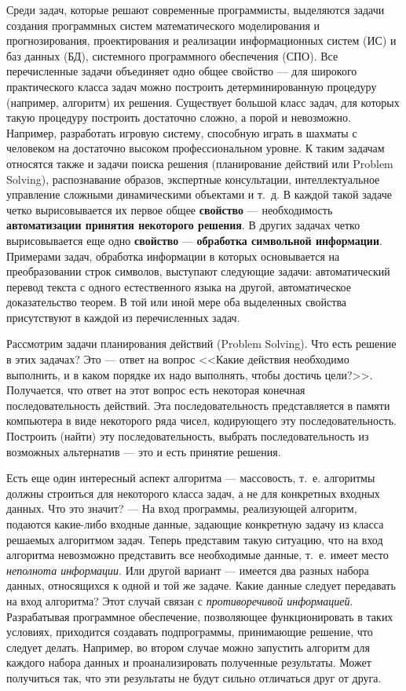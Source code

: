 \documentclass[12pt, openany, twoside]{book} %
\begin{document}
Среди задач, которые решают современные программисты, выделяются задачи создания программных систем математического моделирования и прогнозирования, проектирования и реализации информационных систем (ИС) и баз данных (БД), системного программного обеспечения (СПО). Все перечисленные задачи объединяет одно общее свойство --- для широкого практического класса задач можно построить детерминированную процедуру (например, алгоритм) их решения. Существует большой класс задач, для которых такую процедуру построить достаточно сложно, а порой и невозможно. Например, разработать игровую систему, способную играть в шахматы с человеком на достаточно высоком профессиональном уровне. К таким задачам относятся также и задачи поиска решения (планирование действий или Problem Sol\-ving), распознавание образов, экспертные консультации, интеллектуальное управление сложными динамическими объектами и т.~д. В каждой такой задаче четко вырисовывается их первое общее {\bf свойство} --- необходимость {\bf автоматизации принятия некоторого решения}. В других задачах четко вырисовывается еще одно {\bf свойство} --- {\bf обработка символьной информации}. Примерами задач, обработка информации в которых основывается на преобразовании строк символов, выступают следующие задачи: автоматический перевод текста с одного естественного языка на другой, автоматическое доказательство теорем. В той или иной мере оба выделенных свойства присутствуют в каждой из перечисленных задач.

Рассмотрим задачи планирования действий (Problem Sol\-ving). Что есть решение в этих задачах? Это --- ответ на вопрос <<Какие действия необходимо выполнить, и в каком порядке их надо выполнять, чтобы достичь цели?>>. Получается, что ответ на этот вопрос есть некоторая конечная последовательность действий. Эта последовательность представляется в памяти компьютера в виде некоторого ряда чисел, кодирующего эту последовательность. Построить (найти) эту последовательность, выбрать последовательность из возможных альтернатив --- это и есть принятие решения.

Есть еще один интересный аспект алгоритма --- массовость, т.~е. алгоритмы должны строиться для некоторого класса задач, а не для конкретных входных данных. Что это значит? --- На вход программы, реализующей алгоритм, подаются какие-либо входные данные, задающие конкретную задачу из класса решаемых алгоритмом задач. Теперь представим такую ситуацию, что на вход алгоритма невозможно представить все необходимые данные, т.~е. имеет место \emph{неполнота информации}. Или другой вариант --- имеется два разных набора данных, относящихся к одной и той же задаче. Какие данные следует передавать на вход алгоритма? Этот случай связан с \emph{противоречивой информацией}. Разрабатывая программное обеспечение, позволяющее функционировать в таких условиях, приходится создавать подпрограммы, принимающие решение, что следует делать. Например, во втором случае можно запустить алгоритм для каждого набора данных и проанализировать полученные результаты. Может получиться так, что эти результаты не будут сильно отличаться друг от друга.
\end{document}
